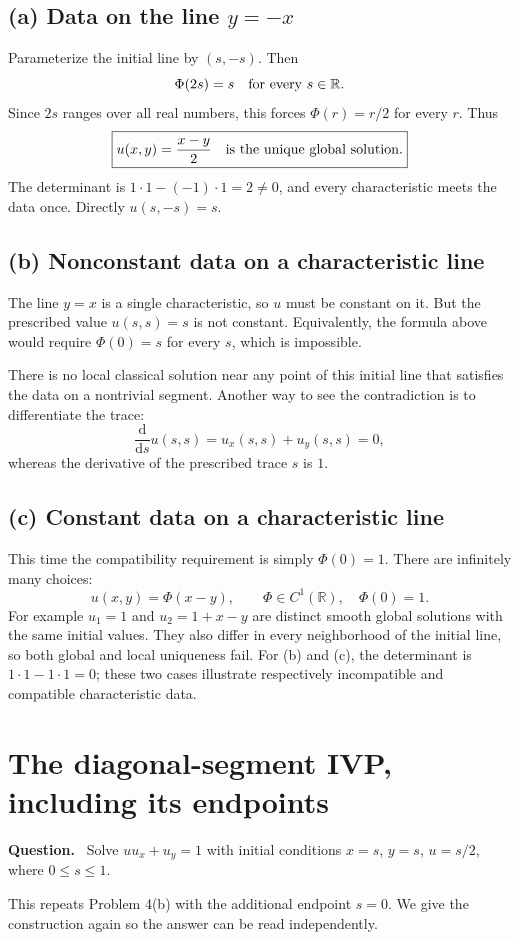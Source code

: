 \documentclass[11pt,a4paper]{article}
\newcommand{\R}{\mathbb R}
\newenvironment{question}{\par\smallskip\begingroup\color{ink}\textbf{Question.}\ }{\par\endgroup\medskip}
\newcommand{\answer}[1]{\begin{equation*}\boxed{\displaystyle #1}\end{equation*}}
\newcommand{\problem}[1]{\clearpage\section{#1}}
\begin{document}
\subsection*{(a) Data on the line $y=-x$}
Parameterize the initial line by $(s,-s)$. Then
\[
 \Phi(2s)=s\quad\hbox{for every }s\in\R.
\]
Since $2s$ ranges over all real numbers, this forces $\Phi(r)=r/2$ for every $r$. Thus
\answer{u(x,y)=\frac{x-y}{2}\quad\hbox{is the unique global solution}.}
The determinant is $1\cdot1-(-1)\cdot1=2\ne0$, and every characteristic meets the data once. Directly $u(s,-s)=s$.

\subsection*{(b) Nonconstant data on a characteristic line}
The line $y=x$ is a single characteristic, so $u$ must be constant on it. But the prescribed value $u(s,s)=s$ is not constant. Equivalently, the formula above would require $\Phi(0)=s$ for every $s$, which is impossible.

There is no local classical solution near any point of this initial line that satisfies the data on a nontrivial segment. Another way to see the contradiction is to differentiate the trace:
\[
 \frac{\mathrm d}{\mathrm ds}u(s,s)=u_x(s,s)+u_y(s,s)=0,
\]
whereas the derivative of the prescribed trace $s$ is $1$.

\subsection*{(c) Constant data on a characteristic line}
This time the compatibility requirement is simply $\Phi(0)=1$. There are infinitely many choices:
\[
 u(x,y)=\Phi(x-y),\qquad\Phi\in C^1(\R),\quad\Phi(0)=1.
\]
For example $u_1=1$ and $u_2=1+x-y$ are distinct smooth global solutions with the same initial values. They also differ in every neighborhood of the initial line, so both global and local uniqueness fail. For (b) and (c), the determinant is $1\cdot1-1\cdot1=0$; these two cases illustrate respectively incompatible and compatible characteristic data.

\problem{The diagonal-segment IVP, including its endpoints}
\begin{question}
Solve $uu_x+u_y=1$ with initial conditions $x=s$, $y=s$, $u=s/2$, where $0\le s\le1$.
\end{question}
This repeats Problem 4(b) with the additional endpoint $s=0$. We give the construction again so the answer can be read independently.
\end{document}

